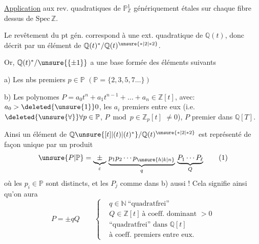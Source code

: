 \uline{Application} aux rev. quadratiques de $\mathbb P^1_{\mathbb Z}$  génériquement  étales sur chaque fibre  dessus de $\mathrm{Spec}\,\mathbb Z$.

Le revêtement  du pt gén. correspond à une ext. quadratique de $\mathbb Q(t)$, donc décrit par un élément de $\mathbb Q(t)^*/\mathbb Q(t)^{\unsure{*|2|*2}}$.

Or, $\mathbb Q(t)^{*}/\unsure{\{\pm1\}}$ a une base formée des éléments suivants

a) Les nbs premiers $p\in\mathbb P$ \unsure{!} $(\mathbb P=\{2,3,5,7\ldots\})$

b) Les polynomes $P=a_0t^n+a_1t^{n-1}+\ldots+a_n\in\mathbb Z[t]$, avec: $a_0>\deleted{\unsure{1}}0$,  les $a_i$ premiers entre eux (i.e. $\deleted{\unsure{\forall}}\forall p\in\mathbb P$, $P\bmod p\in\mathbb Z_p[t]$  $\ne0$), $P$ premier dans $\mathbb Q[T]$.

Ainsi un élément de $\mathbb Q\unsure{[t]|(t)|(t)^*}/\mathbb Q(t)^{\unsure{*|2|*2}}$ est représenté de façon unique par un produit
\[
\unsure{P|\mathbb P}=\underbrace{\pm}_{\varepsilon}\,
\underbrace{p_1p_2\cdots p_{\unsure{h|k|n}}}_{q}\,
\underbrace{P_1\cdots P_\ell}_{Q}\tag*{(1)}
\]
où les $p_i\in\mathbb P$ sont distincts, et les $P_j$ comme dans b) aussi ! Cela signifie ainsi qu'on aura
\[
P=\pm qQ\qquad
\left\{\begin{aligned}
&q\in\mathbb N\ \text{``quadratfrei''}\\
&Q\in\mathbb Z[t]\ \text{à coeff. dominant }>0\\
&\text{``quadratfrei'' dans }\mathbb Q[t]\\
&\text{à coeff. premiers entre eux.}
\end{aligned}\right.
\]
